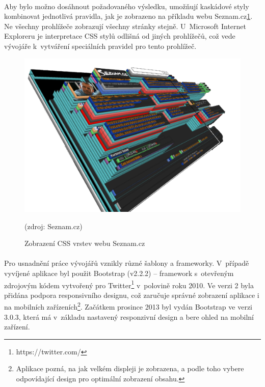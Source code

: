 \documentclass[11pt,a4paper,titlepage,oneside]{book}
\begin{document}

		\paragraph{} Aby bylo možno dosáhnout požadovaného výsledku, umožňují kaskádové styly kombinovat jednotlivá pravidla, jak je zobrazeno na příkladu webu Seznam.cz\ref{fig:seznam}. Ne všechny prohlížeče zobrazují všechny stránky stejně. U~Microsoft Internet Exploreru je interpretace CSS stylů odlišná od jiných prohlížečů, což vede vývojáře k~vytváření speciálních pravidel pro tento prohlížeč.
		\begin{figure}[!h]
			\begin{center}
				\includegraphics[width=12cm]{obrazky/css_vrstvy.png}
				\caption{Zobrazení CSS vrstev webu Seznam.cz}
				\label{fig:seznam}
				(zdroj: Seznam.cz)
			\end{center}
		\end{figure}	


		\paragraph{} Pro usnadnění práce vývojářů vznikly různé šablony a frameworky. V~pří\-padě vyvíjené aplikace byl použit Bootstrap (v2.2.2) -- framework s~otevřeným zdrojovým kódem vytvořený pro Twitter\footnote{https://twitter.com/} v~polovině roku 2010. Ve verzi 2 byla přidána podpora responsivního designu, což zaručuje správné zobrazení aplikace i na mobilních zařízeních\footnote{Aplikace pozná, na jak velkém displeji je zobrazena, a podle toho vybere odpovídající design pro optimální zobrazení obsahu.}. Začátkem prosince 2013 byl vydán Bootstrap ve verzi 3.0.3, která má v~základu nastavený responzivní design a bere ohled na mobilní zařízení.
\end{document}
